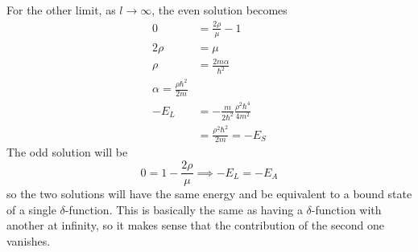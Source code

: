 \documentclass[a4paper,twoside]{article}
\begin{document}
\begin{itemize}
\begin{problem}
        For the other limit, as $ l \to \infty $, the even solution becomes
        \begin{align}
            0 &= \frac{2 \rho}{\mu} - 1\\
            2 \rho &= \mu\\
            \rho &= \frac{2 m \alpha}{\hbar^2 }\\
            \alpha = \frac{\rho \hbar^2}{2m}\\
            -E_L &= - \frac{m}{2 \hbar^2} \frac{\rho^2 \hbar^4}{4 m^2}\\
            &= \frac{\rho^2 \hbar^2}{2 m} = -E_S
        \end{align}
        The odd solution will be
        \begin{equation}
            0 = 1 - \frac{2 \rho}{\mu} \implies -E_L = -E_A
        \end{equation}
        so the two solutions will have the same energy and be equivalent to a bound state of a single $\delta$-function. This is basically the same as having a $\delta$-function with another at infinity, so it makes sense that the contribution of the second one vanishes.


\end{problem}
\end{itemize}
\end{document}
